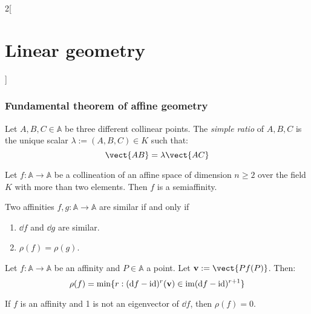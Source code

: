 \documentclass[../../../main_math.tex]{subfiles}
\begin{document}
\begin{multicols}{2}[\section{Linear geometry}]
  \subsubsection{Fundamental theorem of affine geometry}
  \begin{definition}
    Let $A,B,C\in\mathbb{A}$ be three different collinear points. The \emph{simple ratio} of $A,B,C$ is the unique scalar $\lambda:=(A,B,C)\in K$ such that: $$\vect{AB}=\lambda\vect{AC}$$
    \begin{theorem}
      Let $f:\mathbb{A}\rightarrow\mathbb{A}$ be a collineation of an affine space of dimension $n\geq 2$ over the field $K$ with more than two elements. Then $f$ is a semiaffinity.
    \end{theorem}
    \begin{proposition}
      Two affinities $f,g:\mathbb{A}\rightarrow\mathbb{A}$ are similar if and only if
      \begin{enumerate}
        \item $\dd{f}$ and $\dd{g}$ are similar.
        \item $\rho(f)=\rho(g)$.
      \end{enumerate}
    \end{proposition}
    \begin{theorem}
      Let $f:\mathbb{A}\rightarrow\mathbb{A}$ be an affinity and $P\in\mathbb{A}$ a point. Let $\vf{v}:=\vect{Pf(P)}$. Then: $$\rho(f)=\min\{r:(\dd{f}-\mathrm{id})^r(\boldsymbol{\mathrm{v}})\in\operatorname{im}(\dd{f}-\mathrm{id})^{r+1}\}$$
    \end{theorem}
    \begin{corollary}
      If $f$ is an affinity and 1 is not an eigenvector of $\dd{f}$, then $\rho(f)=0$.
    \end{corollary}
  \end{definition}

\end{multicols}
\end{document}
